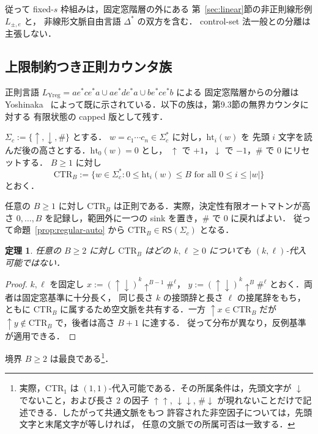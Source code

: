 \documentclass[11pt,a4paper]{ltjsarticle}
\newtheorem{theorem}{定理}[section]
\theoremstyle{remark}
\theoremstyle{plain}
\begin{document}
従って fixed-$s$ 枠組みは，固定窓階層の外にある
第~\ref{sec:linear}節の非正則線形例 $L_{\pm,e}$ と，
非線形文脈自由言語 $\Delta^*$ の双方を含む．
control-set 法一般との分離は主張しない．

\subsection{上限制約つき正則カウンタ族}

正則言語 $L_{\mathrm{Yreg}}=ae^*ce^*a\cup ae^*de^*a\cup be^*ce^*b$ による
固定窓階層からの分離は Yoshinaka~\cite[Proposition~1]{yoshinaka2008}
によって既に示されている．以下の族は，第9.3節の無界カウンタに対する
有限状態の capped 版として残す．

$\Sigma_c:=\{\uparrow,\downarrow,\#\}$ とする．
$w=c_1\cdots c_n\in\Sigma_c^*$ に対し，$\mathrm{ht}_i(w)$ を
先頭 $i$ 文字を読んだ後の高さとする．$\mathrm{ht}_0(w)=0$ とし，
$\uparrow$ で $+1$，$\downarrow$ で $-1$，$\#$ で $0$ にリセットする．
$B\ge1$ に対し
\[
\mathrm{CTR}_B:=
\{w\in\Sigma_c^*:0\le\mathrm{ht}_i(w)\le B
\text{ for all }0\le i\le|w|\}
\]
とおく．

任意の $B\ge1$ に対し $\mathrm{CTR}_B$ は正則である．実際，決定性有限オートマトンが高さ
$0,\ldots,B$ を記録し，範囲外に一つの sink を置き，$\#$ で $0$ に戻ればよい．
従って命題~\ref{prop:regular-auto} から
$\mathrm{CTR}_B\in\mathsf{RS}(\Sigma_c)$ となる．

\begin{theorem}\label{thm:ctr-non-kl}
任意の $B\ge2$ に対し $\mathrm{CTR}_B$ はどの $k,\ell\ge0$ についても
$(k,\ell)$-代入可能ではない．
\end{theorem}
\begin{proof}
$k,\ell$ を固定し
$x:=(\uparrow\downarrow)^k\uparrow^{B-1}\#^\ell$，
$y:=(\uparrow\downarrow)^k\uparrow^B\#^\ell$ とおく．両者は固定窓基準に十分長く，
同じ長さ $k$ の接頭辞と長さ $\ell$ の接尾辞をもち，ともに
$\mathrm{CTR}_B$ に属するため空文脈を共有する．一方
$\uparrow x\in\mathrm{CTR}_B$ だが
$\uparrow y\notin\mathrm{CTR}_B$ で，後者は高さ $B+1$ に達する．
従って分布が異なり，反例基準が適用できる．
\end{proof}

境界 $B\ge2$ は最良である\footnote{実際，$\mathrm{CTR}_1$ は
$(1,1)$-代入可能である．その所属条件は，先頭文字が
$\downarrow$ でないこと，および長さ $2$ の因子
$\uparrow\uparrow$, $\downarrow\downarrow$, $\#\downarrow$
が現れないことだけで記述できる．したがって共通文脈をもつ
許容された非空因子については，先頭文字と末尾文字が等しければ，
任意の文脈での所属可否は一致する．}．
\end{document}
